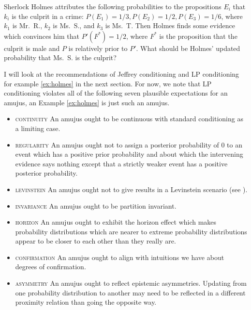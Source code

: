 \documentclass[11pt]{article} \usepackage{october} \onehalfspacing
\begin{document}
\begin{quotex}
  \label{ex:holmes} Sherlock Holmes
  attributes the following probabilities to the propositions $E_{i}$
  that $k_{i}$ is the culprit in a crime:
  $P(E_{1})=1/3,P(E_{2})=1/2,P(E_{3})=1/6$, where $k_{1}$ is Mr.\ R.,
  $k_{2}$ is Ms.\ S., and $k_{3}$ is Ms.\ T. Then Holmes finds some
  evidence which convinces him that $P'(F^{*})=1/2$, where $F^{*}$ is
  the proposition that the culprit is male and $P$ is relatively prior
  to $P'$. What should be Holmes' updated probability that Ms.\ S. is
  the culprit?
\end{quotex}

I will look at the recommendations of Jeffrey conditioning and LP
conditioning for example \ref{ex:holmes} in the next section. For now,
we note that LP conditioning violates all of the following seven
plausible expectations for an amujus, an  Example
\ref{ex:holmes} is just such an amujus.

\begin{itemize}
\item \textsc{continuity} An amujus ought to be continuous with
  standard conditioning as a limiting case.
\item \textsc{regularity} An amujus ought not to assign a posterior
  probability of $0$ to an event which has a positive prior
  probability and about which the intervening evidence says nothing
  except that a strictly weaker event has a positive posterior
  probability.
\item \textsc{levinstein} An amujus ought not to give  results in a Levinstein scenario (see
  ).
\item \textsc{invariance} An amujus ought to be partition invariant.
\item \textsc{horizon} An amujus ought to exhibit the horizon effect
  which makes probability distributions which are nearer to extreme
  probability distributions appear to be closer to each other than
  they really are.
\item \textsc{confirmation} An amujus ought to align with intuitions
  we have about degrees of confirmation.
\item \textsc{asymmetry} An amujus ought to reflect epistemic
  asymmetries. Updating from one probability distribution to another
  may need to be reflected in a different proximity relation than
  going the opposite way.
\end{itemize}
\end{document}
